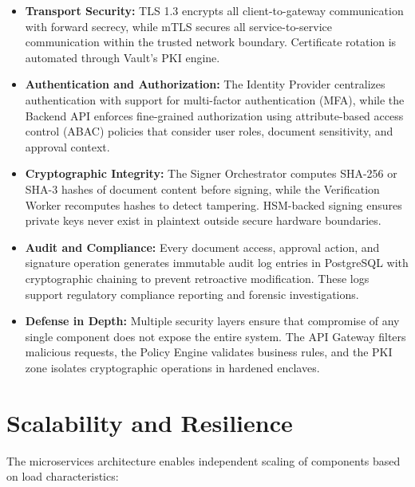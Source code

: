 \documentclass[12pt,oneside,openright,a4paper]{cpe-english-project}
\begin{document}
\begin{itemize}
\item \textbf{Transport Security:} TLS 1.3 encrypts all client-to-gateway communication with forward secrecy, while mTLS secures all service-to-service communication within the trusted network boundary. Certificate rotation is automated through Vault's PKI engine.

\item \textbf{Authentication and Authorization:} The Identity Provider centralizes authentication with support for multi-factor authentication (MFA), while the Backend API enforces fine-grained authorization using attribute-based access control (ABAC) policies that consider user roles, document sensitivity, and approval context.

\item \textbf{Cryptographic Integrity:} The Signer Orchestrator computes SHA-256 or SHA-3 hashes of document content before signing, while the Verification Worker recomputes hashes to detect tampering. HSM-backed signing ensures private keys never exist in plaintext outside secure hardware boundaries.

\item \textbf{Audit and Compliance:} Every document access, approval action, and signature operation generates immutable audit log entries in PostgreSQL with cryptographic chaining to prevent retroactive modification. These logs support regulatory compliance reporting and forensic investigations.

\item \textbf{Defense in Depth:} Multiple security layers ensure that compromise of any single component does not expose the entire system. The API Gateway filters malicious requests, the Policy Engine validates business rules, and the PKI zone isolates cryptographic operations in hardened enclaves.
\end{itemize}

\vspace{1em}

\section{Scalability and Resilience}

The microservices architecture enables independent scaling of components based on load characteristics:
\end{document}
